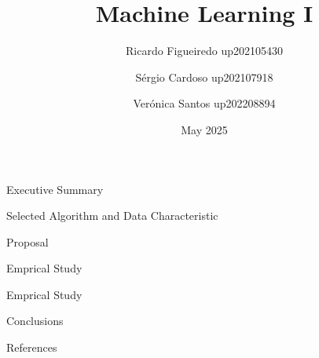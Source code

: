 \documentclass{beamer}
\title{Machine Learning I}
\author[Ricardo Figueiredo, Sérgio Cardoso, Verónica Santos]
{Ricardo Figueiredo up202105430 \and Sérgio Cardoso up202107918 \and Verónica Santos up202208894}
\date{May 2025}
\begin{document}
\maketitle

\begin{frame}{Executive Summary}
\end{frame}

\begin{frame}{Selected Algorithm and Data Characteristic}
\end{frame}

\begin{frame}{Proposal}
\end{frame}

\begin{frame}{Emprical Study}
\end{frame}

\begin{frame}{Emprical Study}
\end{frame}

\begin{frame}{Conclusions}
\end{frame}

\begin{frame}{References}
\end{frame}
\end{document}
